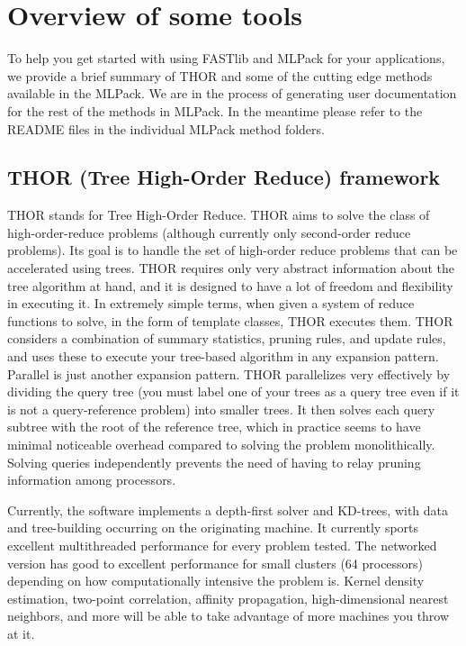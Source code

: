 \documentclass[letter]{report}
\begin{document}
\section{Overview of some tools}
To help you get started with using FASTlib and MLPack for your applications, we provide a brief summary of THOR and some of the cutting edge methods available in the MLPack. We are in the process of generating user documentation for the rest of the methods in MLPack. In the meantime please refer to the README files in the individual MLPack method folders.

\subsection{THOR (Tree High-Order Reduce) framework}
THOR stands for Tree High-Order Reduce. THOR aims to solve the class of high-order-reduce problems (although currently only second-order reduce problems). Its goal is to handle the set of high-order reduce problems that can be accelerated using trees. THOR requires only very abstract information about the tree algorithm at hand, and it is designed to have a lot of freedom and flexibility in executing it. In extremely simple terms, when given a system of reduce functions to solve, in the form of template classes, THOR executes them. THOR considers a combination of summary statistics, pruning rules, and update rules, and uses these to execute your tree-based algorithm in any expansion pattern. Parallel is just another expansion pattern. THOR parallelizes very effectively by dividing the query tree (you must label one of your trees as a query tree even if it is not a query-reference problem) into smaller trees. It then solves each query subtree with the root of the reference tree, which in practice seems to have minimal noticeable overhead compared to solving the problem monolithically. Solving queries independently prevents the need of having to relay pruning information among processors. 

Currently, the software implements a depth-first solver and KD-trees, with data and tree-building occurring on the originating machine. It currently sports excellent multithreaded performance for every problem tested. The networked version has good to excellent performance for small clusters (64 processors) depending on how computationally intensive the problem is. Kernel density estimation, two-point correlation, affinity propagation, high-dimensional nearest neighbors, and more will be able to take advantage of more machines you throw at it. 
\end{document}
